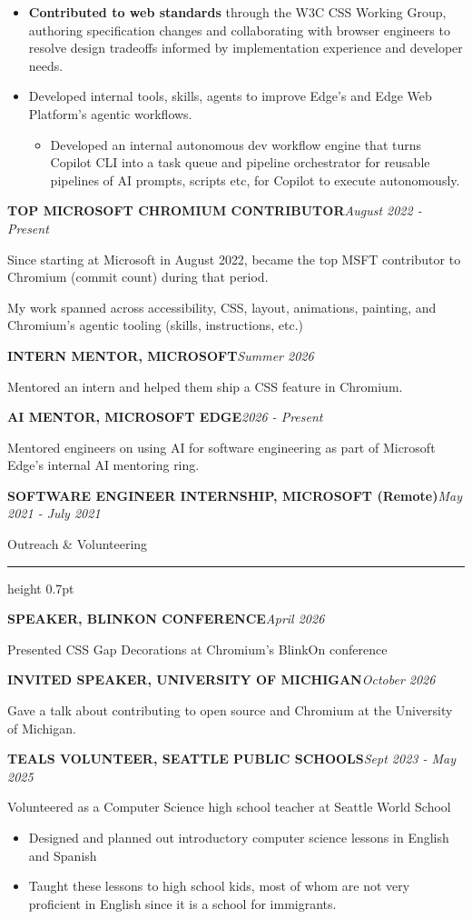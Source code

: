 \documentclass[10pt,letterpaper]{article}
\newcommand{\resumesection}[1]{%
  \par\addvspace{5pt}%
  {\fontsize{12}{13}\selectfont #1\par}%
  \vspace{0.5pt}\hrule height 0.7pt\vspace{3pt}%
}
\newcommand{\role}[2]{%
  \par\addvspace{6pt}%
  \textbf{#1}\hfill\textit{#2}\par\nobreak
}
\begin{document}
\begin{itemize}
\begin{itemize}
  \end{itemize}
  \item \textbf{Contributed to web standards} through the W3C CSS Working Group, authoring specification changes and collaborating with browser engineers to resolve design tradeoffs informed by implementation experience and developer needs.
  \item Developed internal tools, skills, agents to improve Edge’s and Edge Web Platform’s agentic workflows.
  \begin{itemize}
    \item Developed an internal autonomous dev workflow engine that turns Copilot CLI into a task queue and pipeline orchestrator for reusable pipelines of AI prompts, scripts etc, for Copilot to execute autonomously.
  \end{itemize}
\end{itemize}

\role{TOP MICROSOFT CHROMIUM CONTRIBUTOR}{August 2022 - Present}
Since starting at Microsoft in August 2022, became the top MSFT contributor to Chromium (commit count) during that period.\par
My work spanned across accessibility, CSS, layout, animations, painting, and Chromium's agentic tooling (skills, instructions, etc.)

\role{INTERN MENTOR, MICROSOFT}{Summer 2026}
Mentored an intern and helped them ship a CSS feature in Chromium.

\role{AI MENTOR, MICROSOFT EDGE}{2026 - Present}
Mentored engineers on using AI for software engineering as part of Microsoft Edge’s internal AI mentoring ring.

\role{SOFTWARE ENGINEER INTERNSHIP, MICROSOFT (Remote)}{May 2021 - July 2021}

\resumesection{Outreach \& Volunteering}
\role{SPEAKER, BLINKON CONFERENCE}{April 2026}
Presented CSS Gap Decorations at Chromium’s BlinkOn conference

\role{INVITED SPEAKER, UNIVERSITY OF MICHIGAN}{October 2026}
Gave a talk about contributing to open source and Chromium at the University of Michigan.

\role{TEALS VOLUNTEER, SEATTLE PUBLIC SCHOOLS}{Sept 2023 - May 2025}
Volunteered as a Computer Science high school teacher at Seattle World School
\begin{itemize}
  \item Designed and planned out introductory computer science lessons in English and Spanish
  \item Taught these lessons to high school kids, most of whom are not very proficient in English since it is a school for immigrants.
\end{itemize}
\end{document}
